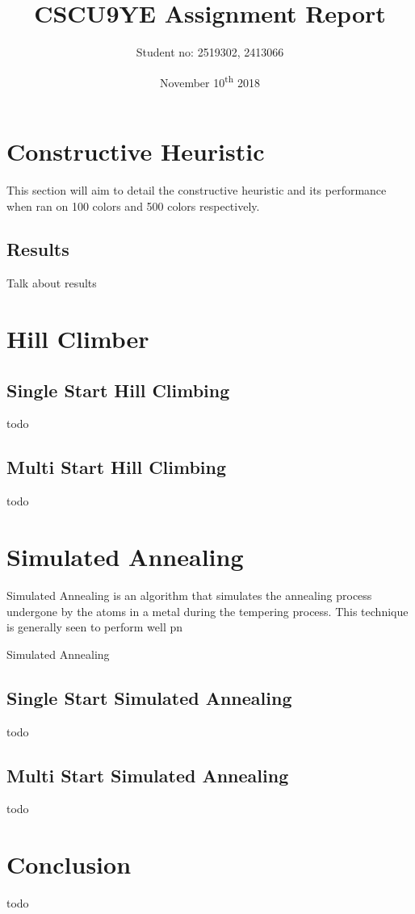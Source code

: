\documentclass[11pt, a4paper]{report}
\title{CSCU9YE Assignment Report}
\author{Student no: 2519302, 2413066}
\date{November 10\textsuperscript{th} 2018}
\begin{document}
\begin{titlepage}
\maketitle
\end{titlepage}
\doublespacing
{}
\tableofcontents
\newpage
\singlespacing

\section*{Constructive Heuristic}
This section will aim to detail the constructive heuristic and its performance when ran on 100 colors and 500 colors respectively.

\subsection*{Results}
Talk about results

\section*{Hill Climber}
\subsection*{Single Start Hill Climbing}
todo

\subsection*{Multi Start Hill Climbing}
todo

\section*{Simulated Annealing}
Simulated Annealing is an algorithm that simulates the annealing process undergone by the atoms in a metal during the tempering process. This technique is generally seen to perform well pn 

Simulated Annealing 

\subsection*{Single Start Simulated Annealing}
todo

\subsection*{Multi Start Simulated Annealing}
todo

\section*{Conclusion}
todo
\end{document}
